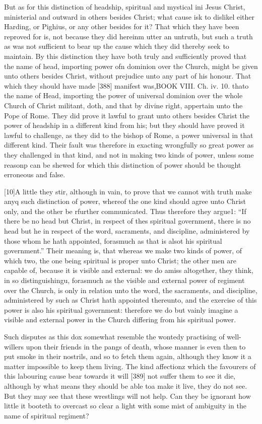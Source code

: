 But as for this distinction of headship, spiritual and mystical ini Jesus Christ, ministerial and outward in others besides Christ; what cause isk to dislikel either Harding, or Pighius, or any other besides for it? That which they have been reproved for is, not because they did hereinm utter an untruth, but such a truth as was not sufficient to bear up the cause which they did thereby seek to maintain. By this distinction they have both truly and sufficiently proved that the name of head, importing power ofn dominion over the Church, might be given unto others besides Christ, without prejudice unto any part of his honour. That which they should have made [388] manifest was,BOOK VIII. Ch. iv. 10. thato the name of Head, importing the power of universal dominion over the whole Church of Christ militant, doth, and that by divine right, appertain unto the Pope of Rome. They did prove it lawful to grant unto others besides Christ the power of headship in a different kind from his; but they should have proved it lawful to challenge, as they did to the bishop of Rome, a power universal in that different kind. Their fault was therefore in exacting wrongfully so great power as they challenged in that kind, and not in making two kinds of power, unless some reasonp can be shewed for which this distinction of power should be thought erroneous and false.

[10]A little they stir, although in vain, to prove that we cannot with truth make anyq such distinction of power, whereof the one kind should agree unto Christ only, and the other be rfurther communicated. Thus therefore they argue1: “If there be no head but Christ, in respect of thes spiritual government, there is no head but he in respect of the word, sacraments, and discipline, administered by those whom he hath appointed, forasmuch as that is alsot his spiritual government.” Their meaning is, that whereas we make two kinds of power, of which two, the one being spiritual is proper unto Christ; the other men are capable of, because it is visible and external: we do amiss altogether, they think, in so distinguishingu, forasmuch as the visible and external power of regiment over the Church, is only in relation unto the word, the sacraments, and discipline, administered by such as Christ hath appointed thereunto, and the exercise of this power is also his spiritual government: therefore we do but vainly imagine a visible and external power in the Church differing from his spiritual power.

Such disputes as this dox somewhat resemble the wontedy practising of well-willers upon their friends in the pangs of death, whose manner is even then to put smoke in their nostrils, and so to fetch them again, although they know it a matter impossible to keep them living. The kind affectionz which the favourers of this labouring cause bear towards it will [389] not suffer them to see it die, although by what means they should be able toa make it live, they do not see. But they may see that these wrestlings will not help. Can they be ignorant how little it booteth to overcast so clear a light with some mist of ambiguity in the name of spiritual regiment?

